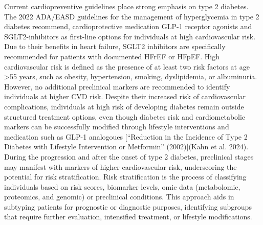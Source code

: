 \documentclass[
  a4paper,
  headsepline=true,
  open=any]{scrbook}
\begin{document}
Current cardiopreventive guidelines place strong emphasis on type 2
diabetes. The 2022 ADA/EASD guidelines for the management of
hyperglycemia in type 2 diabetes recommend, cardioprotective medication
GLP-1 receptor agonists and SGLT2-inhibitors as first-line options for
individuals at high cardiovascular risk. Due to their benefits in heart
failure, SGLT2 inhibitors are specifically recommended for patients with
documented HFrEF or HFpEF. High cardiovascular risk is defined as the
presence of at least two risk factors at age \textgreater55 years, such
as obesity, hypertension, smoking, dyslipidemia, or albuminuria.
However, no additional preclinical markers are recommended to identify
individuals at higher CVD risk. Despite their increased risk of
cardiovascular complications, individuals at high risk of developing
diabetes remain outside structured treatment options, even though
diabetes risk and cardiometabolic markers can be successfully modified
through lifestyle interventions and medication such as GLP-1 analogoues
{[}{``Reduction in the Incidence of Type 2 Diabetes with Lifestyle
Intervention or Metformin''} (2002){]}(Kahn et al. 2024). During the
progression and after the onset of type 2 diabetes, preclinical stages
may manifest with markers of higher cardiovascular risk, underscoring
the potential for risk stratification. Risk stratification is the
process of classifying individuals based on risk scores, biomarker
levels, omic data (metabolomic, proteomics, and genomic) or preclinical
conditions. This approach aids in subtyping patients for prognostic or
diagnostic purposes, identifying subgroups that require further
evaluation, intensified treatment, or lifestyle modifications.
\end{document}
